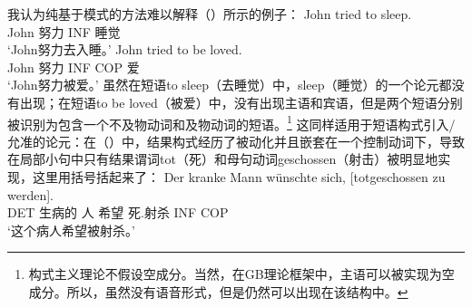 \begin{exe}
\begin{xlist}[iv.]
\begin{exe}
\begin{xlist}[iv.]
我认为纯基于模式的方法难以解释（）所示的例子：
\eal
\ex 
\gll John tried to sleep.\\
     John 努力 INF 睡觉\\
\glt `John努力去入睡。'
\ex
\gll John tried to be loved.\\
     John 努力 INF COP 爱\\
\glt `John努力被爱。' 
\zl
虽然在短语to sleep（去睡觉）中，sleep（睡觉）的一个论元都没有出现；在短语to be loved（被爱）中，没有出现主语和宾语，但是两个短语分别被识别为包含一个不及物动词和及物动词的短语。\footnote{
构式主义理论不假设空成分。当然，在GB理论框架中，主语可以被实现为空成分。所以，虽然没有语音形式，但是仍然可以出现在该结构中。%
}  
这同样适用于短语构式引入/允准的论元：在（）中，结果构式经历了被动化并且嵌套在一个控制动词下，导致在局部小句中只有结果谓词tot（死）和母句动词geschossen（射击）被明显地实现，这里用括号括起来了：
\ea
\gll Der kranke Mann wünschte sich,   [totgeschossen zu werden].\footnotemark\\
     DET 生病的   人  希望   \self{} \spacebr{}死.射杀      INF COP\\
\glt `这个病人希望被射杀。'

\end{xlist}
\end{exe}
\end{xlist}
\end{exe}
